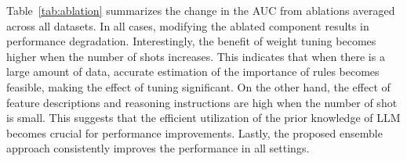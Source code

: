 \documentclass{article}
\theoremstyle{plain}
\theoremstyle{definition}
\theoremstyle{remark}
\newcommand{\cutparagraphup}{\vspace*{-0.12in}}
\begin{document}
Table~\ref{tab:ablation} summarizes the change in the AUC from ablations averaged across all datasets. In all cases, modifying the ablated component results in performance degradation. Interestingly, the benefit of weight tuning becomes higher when the number of shots increases. This indicates that when there is a large amount of data, accurate estimation of the importance of rules becomes feasible, making the effect of tuning significant. On the other hand, the effect of feature descriptions and reasoning instructions are high when the number of shot is small. This suggests that the efficient utilization of the prior knowledge of LLM becomes crucial for performance improvements. Lastly, the proposed ensemble approach consistently improves the performance in all settings. 


\begin{table}[h!]
\centering
\setlength{\tabcolsep}{4.5pt}
\caption{Ablation study summaries. Averaged changes of AUC with standard error after altering or omitting modules over 13 datasets with three different trials are reported.}
\label{tab:ablation}
\end{table}


\cutparagraphup
\end{document}
